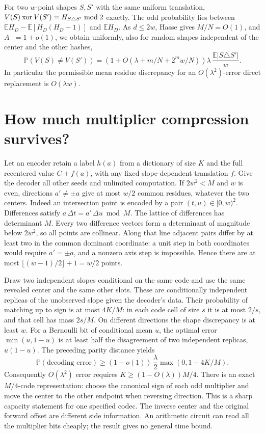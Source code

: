 \documentclass[11pt]{article}
\newcommand{\E}{\mathbb E}
\newcommand{\Prb}{\mathbb P}
\begin{document}
For two $w$-point shapes $S,S'$ with the same uniform translation,
$V(S)\mathbin{\rm xor}V(S')=H_{S\triangle S'}\bmod2$ exactly.
The odd probability lies between $\E H_D-\E[H_D(H_D-1)]$ and
$\E H_D$. As $d\le 2w$, Hasse gives $M/N=O(1)$, and $A_-=1+o(1)$,
we obtain uniformly, also for random shapes independent of the center
and the other hashes,
\[
 \Prb(V(S)\ne V(S'))=
 \left(1+O(\lambda+m/N+2^m w/N)\right)
 \lambda\,\frac{\E|S\triangle S'|}{w}.
\]
In particular the permissible mean residue discrepancy for an
$O(\lambda^2)$-error direct replacement is $O(\lambda w)$.

\section{How much multiplier compression survives?}
Let an encoder retain a label $h(a)$ from a dictionary of size $K$
and the full recentered value $C+f(a)$, with any fixed slope-dependent
translation $f$. Give the decoder all other seeds and unlimited
computation. If $2w^2<M$ and $w$ is even, directions $a'\ne\pm a$
give at most $w/2$ common residues, whatever the two centers.
Indeed an intersection point is encoded by a pair $(t,u)\in[0,w)^2$.
Differences satisfy $a\,\Delta t=a'\,\Delta u\bmod M$. The lattice of
differences has determinant $M$. Every two difference vectors form
a determinant of magnitude below $2w^2$, so all points are collinear.
Along that line adjacent pairs differ by at least two in the common
dominant coordinate: a unit step in both coordinates would require
$a'=\pm a$, and a nonzero axis step is impossible. Hence there are
at most $\lfloor(w-1)/2\rfloor+1=w/2$ points.

Draw two independent slopes conditional on the same code and use the
same revealed center and the same other slots. These are conditionally
independent replicas of the unobserved slope given the decoder's data.
Their probability of matching up to sign is at most $4K/M$: in each
code cell of size $s$ it is at most $2/s$, and that cell has mass $2s/M$.
On different directions the shape discrepancy is at least $w$.
For a Bernoulli bit of conditional mean $u$, the optimal error
$\min(u,1-u)$ is at least half the disagreement of two independent
replicas, $u(1-u)$. The preceding parity distance yields
\[
 \Prb(\text{decoding error})\ge
 (1-o(1))\,\frac{\lambda}{2}\max(0,1-4K/M).
\]
Consequently $O(\lambda^2)$ error requires $K\ge(1-O(\lambda))M/4$.
There is an exact $M/4$-code representation: choose the canonical
sign of each odd multiplier and move the center to the other endpoint
when reversing direction. This is a sharp capacity statement for one
specified codec. The inverse center and the original forward offset
are different side information. An arithmetic circuit can read all
the multiplier bits cheaply; the result gives no general time bound.
\end{document}
